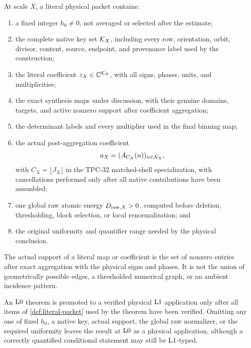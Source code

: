 \begin{definition}
\label{def:literal-packet}
At scale \(X\), a literal physical packet contains:
\begin{enumerate}[label=(P\arabic*),leftmargin=2.7em]
\item a fixed integer \(h_0\ne0\), not averaged or selected after the
estimate;
\item the complete native key set \(\mathcal K_X\), including every row,
orientation, orbit, divisor, content, source, endpoint, and
provenance label used by the construction;
\item the literal coefficient \(z_X\in\mathbb C^{\mathcal K_X}\), with all signs,
phases, units, and multiplicities;
\item the exact synthesis maps under discussion, with their genuine
domains, targets, and active nonzero support after coefficient
aggregation;
\item the determinant labels and every multiplier used in the final
binning map;
\item the actual post-aggregation coefficient
\[
 a_X=(A_{C_X}(n))_{n\in\mathcal N_X},
\]
with \(C_X=\lfloor J_X\rfloor\) in the TPC-32 matched-shell
specialization,
with cancellations performed only after all native contributions
have been assembled;
\item one global raw atomic energy \(D_{{\rm raw},X}>0\), computed
before deletion, thresholding, block selection, or local
renormalization; and
\item the original uniformity and quantifier range needed by the
physical conclusion.
\end{enumerate}
\end{definition}

\begin{definition}
\label{def:actual-support}
The actual support of a literal map or coefficient is the set of
nonzero entries after exact aggregation with the physical signs and
phases.  It is not the union of geometrically possible edges, a
thresholded numerical graph, or an ambient incidence pattern.
\end{definition}

\begin{proposition}
\label{prop:promotion-test}
An \(\mathrm{L0}\) theorem is promoted to a verified physical \(\mathrm{L1}\)
application only after
all items of \cref{def:literal-packet} used by the theorem have been
verified.  Omitting any one of fixed \(h_0\), a native key, actual
support, the global raw normalizer, or the required uniformity leaves
the result at \(\mathrm{L0}\) as a physical application, although a
correctly quantified conditional statement may still be
\(\mathrm{L1}\)-typed.
\end{proposition}

